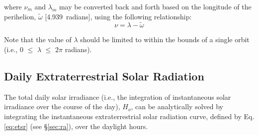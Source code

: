 \noindent where $\nu_m$ and $\lambda_m$ may be converted back and forth based on the  longitude of the perihelion, $\tilde{\omega}$ [4.939~radians], using the following relationship: 
\begin{equation}
\label{eq:nu}
    \nu = \lambda - \tilde{\omega}
\end{equation}

\noindent Note that the value of $\lambda$ should be limited to within the bounds of a single orbit (i.e., 0 $\leq$ $\lambda$ $\leq$ $2\pi$ radians).

\subsection{Daily Extraterrestrial Solar Radiation}
\label{sec:ho}
The total daily solar irradiance (i.e., the integration of instantaneous solar irradiance over the course of the day), $H_o$, can be analytically solved by integrating the instantaneous extraterrestrial solar radiation curve, defined by Eq. \ref{eq:etsr} (see \S \ref{sec:ra}), over the daylight hours. 

